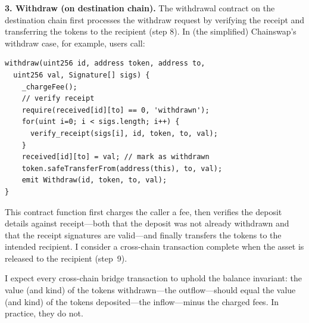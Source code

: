 \textbf{3. Withdraw (on destination chain).}
The withdrawal contract on the destination chain first processes the withdraw
request by verifying the receipt and transferring the tokens to the recipient
(step 8). In (the simplified) Chainswap's withdraw case, for example, users call:
\begin{lstlisting}
withdraw(uint256 id, address token, address to, 
  uint256 val, Signature[] sigs) {
    _chargeFee();
    // verify receipt
    require(received[id][to] == 0, 'withdrawn');
    for(uint i=0; i < sigs.length; i++) {
      verify_receipt(sigs[i], id, token, to, val);
    }
    received[id][to] = val; // mark as withdrawn
    token.safeTransferFrom(address(this), to, val);
    emit Withdraw(id, token, to, val);
}
\end{lstlisting}
This contract function first charges the caller a fee, then verifies the
deposit details against receipt---both that the deposit was not already
withdrawn and that the receipt signatures are valid---and finally transfers the
tokens to the intended recipient.  I consider a cross-chain transaction
complete when the asset is released to the recipient (step~9).

I expect every cross-chain bridge transaction to uphold the balance invariant:
the value (and kind) of the tokens withdrawn---the outflow---should equal the
value (and kind) of the tokens deposited---the inflow---minus the charged fees.
In practice, they do not.




